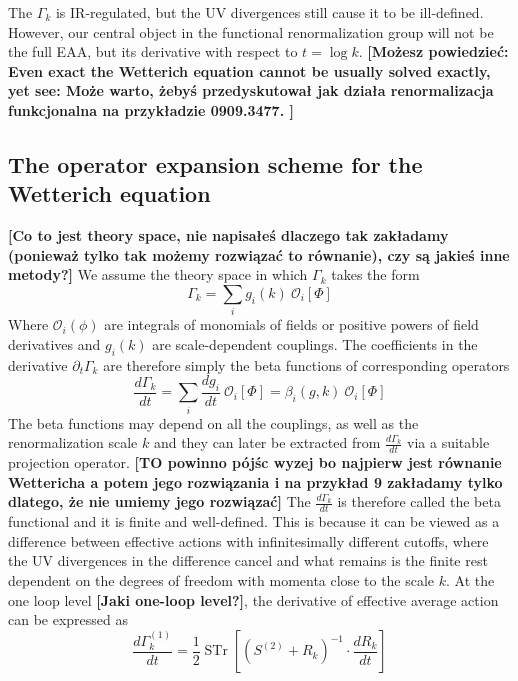 \documentclass[11pt, a4paper]{article}
\newcommand{\jhk}[1]{{\color{red}#1}}
\newcommand{\jhkbf}[1]{\textbf{\color{red} [#1]}}
\begin{document}
The $\Gamma_k$ is IR-regulated, but the UV divergences still cause it to be ill-defined. 
However, our central object in the functional renormalization group will not be the full EAA, 
but its derivative with respect to $t = \log{k}$. 
\jhkbf{Możesz powiedzieć: Even exact the Wetterich equation cannot be usually solved exactly, yet see:
Może warto, żebyś przedyskutował jak działa renormalizacja funkcjonalna na przykładzie 0909.3477.
}
\jhk{\subsection{The operator expansion scheme for the Wetterich equation}}
\jhkbf{Co to jest theory space, nie napisałeś dlaczego tak zakładamy (ponieważ tylko tak możemy rozwiązać to równanie), czy są jakieś inne metody?}
We assume the theory space in which $\Gamma_k$ takes the form
\begin{equation}
    \Gamma_k = \sum_i g_i(k) \ \mathcal{O}_i [\Phi]
    \label{gamma_decomp}
\end{equation}
Where $\mathcal{O}_i (\phi)$ are integrals of monomials of fields or positive powers of field derivatives 
and $g_i(k)$ are scale-dependent couplings.
The coefficients in the derivative $\partial_t \Gamma_k$ are therefore simply the beta functions of corresponding operators
\begin{equation}
    \frac{d \Gamma_k}{dt} = \sum_i \frac{d g_i}{dt} \ \mathcal{O}_i [\Phi] = \beta_i(g,k) \ \mathcal{O}_i [\Phi]
\end{equation}
The beta functions may depend on all the couplings, as well as the renormalization scale $k$ and
they can later be extracted from $\frac{d \Gamma_k}{dt}$ via a suitable projection operator. 
\jhkbf{TO powinno pójśc wyzej bo najpierw jest równanie Wettericha a potem jego rozwiązania i na przykład 9 zakładamy tylko dlatego, że nie umiemy jego rozwiązać}
The $\frac{d \Gamma_k}{dt}$ is therefore called the beta functional and it is finite and well-defined.
This is because it can be viewed as a difference between effective actions with infinitesimally
different cutoffs, where the UV divergences in the difference cancel and what remains is the finite rest
dependent on the degrees of freedom with momenta close to the scale $k$.
At the one loop level \jhkbf{Jaki one-loop level?}, the derivative of effective average action can be expressed as
\begin{equation}
    \frac{d \Gamma_k^{(1)}}{dt} = \frac{1}{2} \operatorname{STr} \left[ \left(S^{(2)} + R_k\right)^{-1} \cdot \frac{d R_k}{dt} \right]
    \label{1LEAA}
\end{equation}
\end{document}

